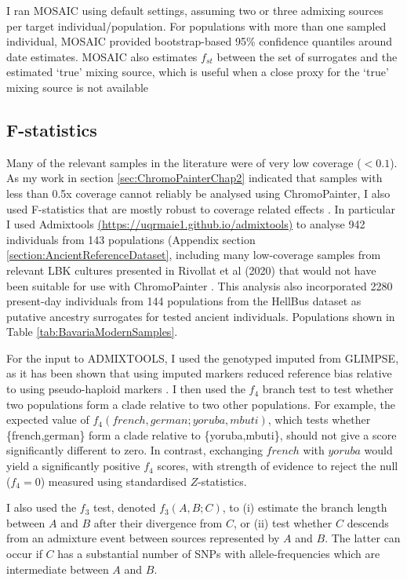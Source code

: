 I ran MOSAIC using default settings, assuming two or three admixing sources per target individual/population. For populations with more than one sampled individual, MOSAIC provided bootstrap-based 95\% confidence quantiles around date estimates. MOSAIC also estimates $f_{st}$ between the set of surrogates and the estimated `true' mixing source, which is useful when a close proxy for the `true' mixing source is not available

\subsection{F-statistics}

Many of the relevant samples in the literature were of very low coverage ($<0.1$). As my work in section \ref{sec:ChromoPainterChap2} indicated that samples with less than 0.5x coverage cannot reliably be analysed using ChromoPainter, I also used F-statistics \cite{Patterson2012} that are mostly robust to coverage related effects \cite{AssessingqpAdm}. In particular I used Admixtools \url{(https://uqrmaie1.github.io/admixtools)} to analyse 942 individuals from 143 populations (Appendix section \ref{section:AncientReferenceDataset}, including many low-coverage samples from relevant LBK cultures presented in Rivollat et al (2020) that would not have been suitable for use with ChromoPainter \cite{rivollat2020france}. This analysis also incorporated 2280 present-day individuals from 144 populations from the HellBus dataset as putative ancestry surrogates for tested ancient individuals. Populations shown in Table \ref{tab:BavariaModernSamples}. 

For the input to ADMIXTOOLS, I used the genotyped imputed from GLIMPSE, as it has been shown that using imputed markers reduced reference bias relative to using pseudo-haploid markers \cite{Martiniano2017}. I then used the $f_{4}$ branch test to test whether two populations form a clade relative to two other populations. For example, the expected value of $f_{4}(french,german;yoruba,mbuti)$, which tests whether \{french,german\} form a clade relative to \{yoruba,mbuti\}, should not give a score significantly different to zero. In contrast, exchanging $french$ with $yoruba$ would yield a significantly positive $f_4$ scores, with strength of evidence to reject the null ($f_4 = 0$) measured using standardised $Z$-statistics.

I also used the $f_3$ test, denoted $f_{3}(A,B;C)$, to (i) estimate the branch length between $A$ and $B$ after their divergence from $C$, or (ii) test whether $C$ descends from an admixture event between sources represented by $A$ and $B$. The latter can occur if $C$ has a substantial number of SNPs with allele-frequencies which are intermediate between $A$ and $B$.

